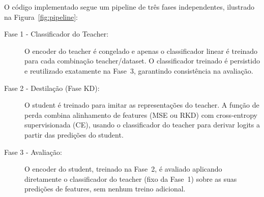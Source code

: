 \documentclass[
  article,            %
  11pt,               %
  letterpaper,        %
  oneside,            %
  sumario = tradicional
]{abntex2}
\begin{document}
O código implementado segue um pipeline de três fases independentes,
ilustrado na Figura~\ref{fig:pipeline}:

\begin{description}
  \item[Fase 1 - Classificador do Teacher:]
    O encoder do teacher é congelado e apenas o classificador linear é treinado
    para cada combinação teacher/dataset. O classificador treinado é persistido
    e reutilizado exatamente na Fase~3, garantindo consistência na avaliação.
  \item[Fase 2 - Destilação (Fase KD):]
    O student é treinado para imitar as representações do teacher. A função de
    perda combina alinhamento de features (MSE ou RKD) com cross-entropy
    supervisionada (CE), usando o classificador do teacher para derivar logits
    a partir das predições do student.
  \item[Fase 3 - Avaliação:]
    O encoder do student, treinado na Fase~2, é avaliado aplicando diretamente
    o classificador do teacher (fixo da Fase~1) sobre as suas predições de
    features, sem nenhum treino adicional.
\end{description}
\end{document}
